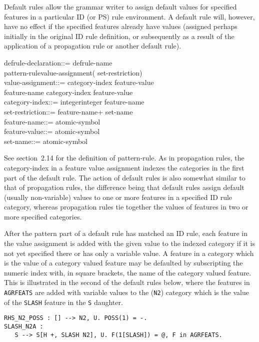 Default rules allow the grammar writer to assign default values for
specified features in a particular ID (or PS) rule environment. A
default rule will, however, have no effect if the specified features
already have values (assigned perhaps initially in the original ID rule
definition, or subsequently as a result of the application of a
propagation rule or another default rule).
\begin{display}
\la defrule-declaration\ra ::= \la defrule-name\ra \lit{:}\\
\cont \la pattern-rule\ra \la value-assignment\ra (\lit{,}   \la set-restriction\ran) \\
\la value-assignment\ra ::=  \lit{(} \la category-index\ra \lit{)} \lit{=} \la feature-value\ra \alt\\
\cont \la feature-name\ra \lit{(} \la category-index\ra \lit{)} \lit{=} \la feature-value\ra\\
\la category-index\ra ::= \la integer\ra \alt \la integer\ra \lit{[} \la feature-name\ra \lit{]}\\
\la set-restriction\ra ::= \lit{\{} \la feature-name\ran+ \lit{\}} \alt \la set-name\ra\\
\la feature-name\ra ::= \la atomic-symbol\ra\\
\la feature-value\ra ::= \la atomic-symbol\ra \alt {}\\
\la set-name\ra ::= \la atomic-symbol\ra
\end{display}
See section~2.14 for the definition of \la pattern-rule\ran. As in propagation
rules, the category-index in a feature value assignment indexes the
categories in the first part of the default rule. The action of default
rules is also somewhat similar to that of propagation rules, the
difference being that default rules assign default (usually
non-variable) values to one or more features in a specified ID rule
category, whereas propagation rules tie together the values of features
in two or more specified categories.

After the pattern part of a default rule has matched an ID rule, each
feature in the value assignment is added with the given value to the
indexed category if it is not yet specified there or has only a variable
value. A feature in a category which is the value of a category valued
feature may be defaulted by subscripting the numeric index with, in
square brackets, the name of the category valued feature. This is
illustrated in the second of the default rules below, where the features
in {\tt AGRFEATS} are added with variable values to the ({\tt N2})
category which is the value of the {\tt SLASH} feature in the {\tt S} daughter.
\begin{ex}
\begin{verbatim}
RHS_N2_POSS : [] --> N2, U. POSS(1) = -.
SLASH_N2A :
   S --> S[H +, SLASH N2], U. F(1[SLASH]) = @, F in AGRFEATS.
\end{verbatim}
\end{ex}

